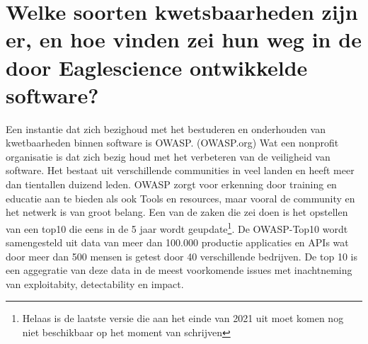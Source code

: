\section{Welke soorten kwetsbaarheden zijn er, en hoe vinden zei hun weg in de door Eaglescience ontwikkelde software?}
Een instantie dat zich bezighoud met het bestuderen en onderhouden van kwetbaarheden binnen software is OWASP. (OWASP.org) Wat een nonprofit organisatie is dat zich bezig houd met het verbeteren van de veiligheid van software. Het bestaat uit verschillende communities in veel landen en heeft meer dan tientallen duizend leden. OWASP zorgt voor erkenning door training en educatie aan te bieden als ook Tools en resources, maar vooral de community en het netwerk is van groot belang. Een van de zaken die zei doen is het opstellen van een top10 die eens in de 5 jaar wordt geupdate\footnote{Helaas is de laatste versie die aan het einde van 2021 uit moet komen nog niet beschikbaar op het moment van schrijven}. De OWASP-Top10 wordt samengesteld uit data van meer dan 100.000 productie applicaties en APIs wat door meer dan 500 mensen is getest door 40 verschillende bedrijven. De top 10 is een aggegratie van deze data in de meest voorkomende issues met inachtneming van exploitabity, detectability en impact.
